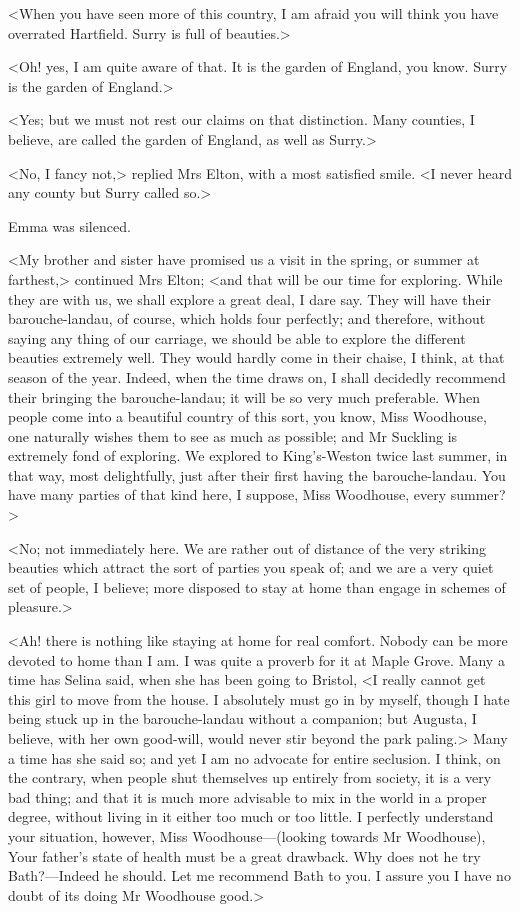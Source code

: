 <When you have seen more of this country, I am afraid you will think you have overrated Hartfield. Surry is full of beauties.>

<Oh! yes, I am quite aware of that. It is the garden of England, you know. Surry is the garden of England.>

<Yes; but we must not rest our claims on that distinction. Many counties, I believe, are called the garden of England, as well as Surry.>

<No, I fancy not,> replied Mrs Elton, with a most satisfied smile. <I never heard any county but Surry called so.>

Emma was silenced.

<My brother and sister have promised us a visit in the spring, or summer at farthest,> continued Mrs Elton; <and that will be our time for exploring. While they are with us, we shall explore a great deal, I dare say. They will have their barouche-landau, of course, which holds four perfectly; and therefore, without saying any thing of our carriage, we should be able to explore the different beauties extremely well. They would hardly come in their chaise, I think, at that season of the year. Indeed, when the time draws on, I shall decidedly recommend their bringing the barouche-landau; it will be so very much preferable. When people come into a beautiful country of this sort, you know, Miss Woodhouse, one naturally wishes them to see as much as possible; and Mr Suckling is extremely fond of exploring. We explored to King's-Weston twice last summer, in that way, most delightfully, just after their first having the barouche-landau. You have many parties of that kind here, I suppose, Miss Woodhouse, every summer?>

<No; not immediately here. We are rather out of distance of the very striking beauties which attract the sort of parties you speak of; and we are a very quiet set of people, I believe; more disposed to stay at home than engage in schemes of pleasure.>

<Ah! there is nothing like staying at home for real comfort. Nobody can be more devoted to home than I am. I was quite a proverb for it at Maple Grove. Many a time has Selina said, when she has been going to Bristol, <I really cannot get this girl to move from the house. I absolutely must go in by myself, though I hate being stuck up in the barouche-landau without a companion; but Augusta, I believe, with her own good-will, would never stir beyond the park paling.> Many a time has she said so; and yet I am no advocate for entire seclusion. I think, on the contrary, when people shut themselves up entirely from society, it is a very bad thing; and that it is much more advisable to mix in the world in a proper degree, without living in it either too much or too little. I perfectly understand your situation, however, Miss Woodhouse—(looking towards Mr Woodhouse), Your father's state of health must be a great drawback. Why does not he try Bath?—Indeed he should. Let me recommend Bath to you. I assure you I have no doubt of its doing Mr Woodhouse good.>

